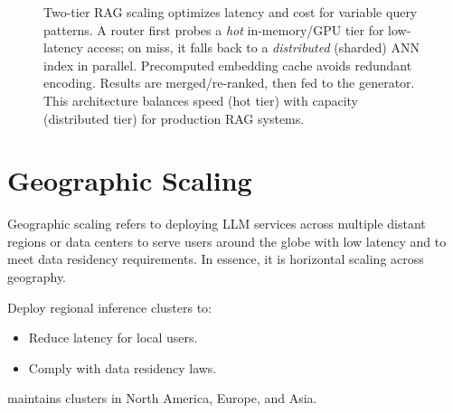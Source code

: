 \begin{figure}[t]
\begin{llmfigbox}
\end{llmfigbox}
\caption{Two-tier RAG scaling optimizes latency and cost for variable query patterns. A router first probes a \emph{hot} in-memory/GPU tier for low-latency access; on miss, it falls back to a \emph{distributed} (sharded) ANN index in parallel. Precomputed embedding cache avoids redundant encoding. Results are merged/re-ranked, then fed to the generator. This architecture balances speed (hot tier) with capacity (distributed tier) for production RAG systems.}
\label{fig:ch06_rag_two_tier}
\end{figure}

\section{Geographic Scaling}
\label{sec:geo-scaling}
Geographic scaling refers to deploying LLM services across multiple distant regions or data centers to serve users around the globe with low latency and to meet data residency requirements. In essence, it is horizontal scaling across geography.

Deploy regional inference clusters to:
\begin{itemize}
    \item Reduce latency for local users.
    \item Comply with data residency laws.
\end{itemize}
\ishtar{} maintains clusters in North America, Europe, and Asia.

